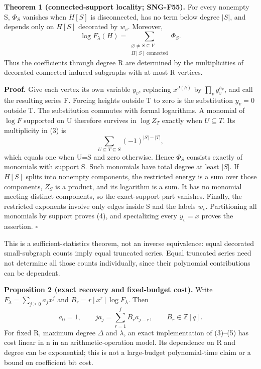 \documentclass[
  11pt,
  a4paper,
]{article}
\begin{document}
\textbf{Theorem 1 (connected-support locality; SNG-F55).} For every
nonempty S, \(\Phi_S\) vanishes when \(H[S]\) is disconnected, has no
term below degree \(|S|\), and depends only on \(H[S]\) decorated by
\(w_v\). Moreover, \[
\log F_\lambda(H)=\sum_{\substack{\varnothing\ne S\subseteq V\\H[S]\text{ connected}}}\Phi_S.
\tag{4}
\] Thus the coefficients through degree R are determined by the
multiplicities of decorated connected induced subgraphs with at most R
vertices.

\textbf{Proof.} Give each vertex its own variable \(y_v\), replacing
\(x^{J(h)}\) by \(\prod_vy_v^{h_v}\), and call the resulting series F.
Forcing heights outside T to zero is the substitution \(y_v=0\) outside
T. The substitution commutes with formal logarithms. A monomial of
\(\log F\) supported on U therefore survives in \(\log Z_T\) exactly
when \(U\subseteq T\). Its multiplicity in (3) is \[
\sum_{U\subseteq T\subseteq S}(-1)^{|S|-|T|},
\] which equals one when U=S and zero otherwise. Hence \(\Phi_S\)
consists exactly of monomials with support S. Such monomials have total
degree at least \(|S|\). If \(H[S]\) splits into nonempty components,
the restricted energy is a sum over those components, \(Z_S\) is a
product, and its logarithm is a sum. It has no monomial meeting distinct
components, so the exact-support part vanishes. Finally, the restricted
exponents involve only edges inside S and the labels \(w_v\).
Partitioning all monomials by support proves (4), and specializing every
\(y_v=x\) proves the assertion. \(\square\)

This is a sufficient-statistics theorem, not an inverse equivalence:
equal decorated small-subgraph counts imply equal truncated series.
Equal truncated series need not determine all those counts individually,
since their polynomial contributions can be dependent.

\textbf{Proposition 2 (exact recovery and fixed-budget cost).} Write
\(F_\lambda=\sum_{j\ge0}a_jx^j\) and \(B_r=r[x^r]\log F_\lambda\). Then
\[
a_0=1,\qquad
j a_j=\sum_{r=1}^j B_r a_{j-r},\qquad B_r\in\mathbb Z[q].
\tag{5}
\] For fixed R, maximum degree \(\Delta\) and \(\lambda\), an exact
implementation of (3)--(5) has cost linear in n in an
arithmetic-operation model. Its dependence on R and degree can be
exponential; this is not a large-budget polynomial-time claim or a bound
on coefficient bit cost.
\end{document}
